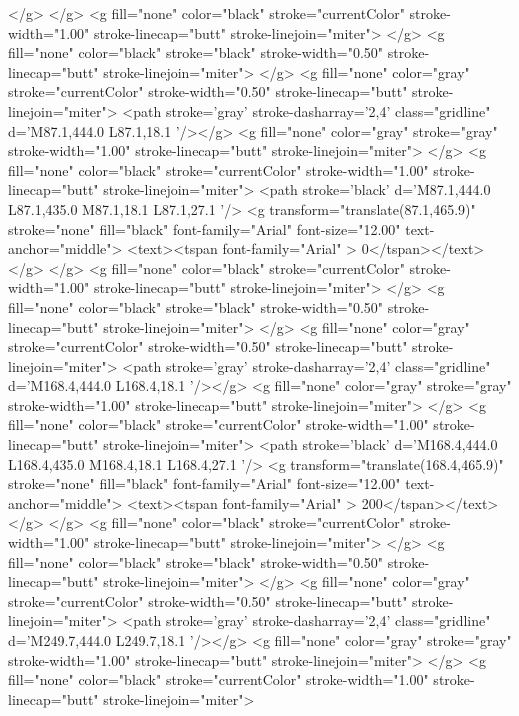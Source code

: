	</g>
</g>
<g fill="none" color="black" stroke="currentColor" stroke-width="1.00" stroke-linecap="butt" stroke-linejoin="miter">
</g>
<g fill="none" color="black" stroke="black" stroke-width="0.50" stroke-linecap="butt" stroke-linejoin="miter">
</g>
<g fill="none" color="gray" stroke="currentColor" stroke-width="0.50" stroke-linecap="butt" stroke-linejoin="miter">
	<path stroke='gray' stroke-dasharray='2,4' class="gridline"  d='M87.1,444.0 L87.1,18.1  '/></g>
<g fill="none" color="gray" stroke="gray" stroke-width="1.00" stroke-linecap="butt" stroke-linejoin="miter">
</g>
<g fill="none" color="black" stroke="currentColor" stroke-width="1.00" stroke-linecap="butt" stroke-linejoin="miter">
	<path stroke='black'  d='M87.1,444.0 L87.1,435.0 M87.1,18.1 L87.1,27.1  '/>	<g transform="translate(87.1,465.9)" stroke="none" fill="black" font-family="Arial" font-size="12.00"  text-anchor="middle">
		<text><tspan font-family="Arial" > 0</tspan></text>
	</g>
</g>
<g fill="none" color="black" stroke="currentColor" stroke-width="1.00" stroke-linecap="butt" stroke-linejoin="miter">
</g>
<g fill="none" color="black" stroke="black" stroke-width="0.50" stroke-linecap="butt" stroke-linejoin="miter">
</g>
<g fill="none" color="gray" stroke="currentColor" stroke-width="0.50" stroke-linecap="butt" stroke-linejoin="miter">
	<path stroke='gray' stroke-dasharray='2,4' class="gridline"  d='M168.4,444.0 L168.4,18.1  '/></g>
<g fill="none" color="gray" stroke="gray" stroke-width="1.00" stroke-linecap="butt" stroke-linejoin="miter">
</g>
<g fill="none" color="black" stroke="currentColor" stroke-width="1.00" stroke-linecap="butt" stroke-linejoin="miter">
	<path stroke='black'  d='M168.4,444.0 L168.4,435.0 M168.4,18.1 L168.4,27.1  '/>	<g transform="translate(168.4,465.9)" stroke="none" fill="black" font-family="Arial" font-size="12.00"  text-anchor="middle">
		<text><tspan font-family="Arial" > 200</tspan></text>
	</g>
</g>
<g fill="none" color="black" stroke="currentColor" stroke-width="1.00" stroke-linecap="butt" stroke-linejoin="miter">
</g>
<g fill="none" color="black" stroke="black" stroke-width="0.50" stroke-linecap="butt" stroke-linejoin="miter">
</g>
<g fill="none" color="gray" stroke="currentColor" stroke-width="0.50" stroke-linecap="butt" stroke-linejoin="miter">
	<path stroke='gray' stroke-dasharray='2,4' class="gridline"  d='M249.7,444.0 L249.7,18.1  '/></g>
<g fill="none" color="gray" stroke="gray" stroke-width="1.00" stroke-linecap="butt" stroke-linejoin="miter">
</g>
<g fill="none" color="black" stroke="currentColor" stroke-width="1.00" stroke-linecap="butt" stroke-linejoin="miter">
